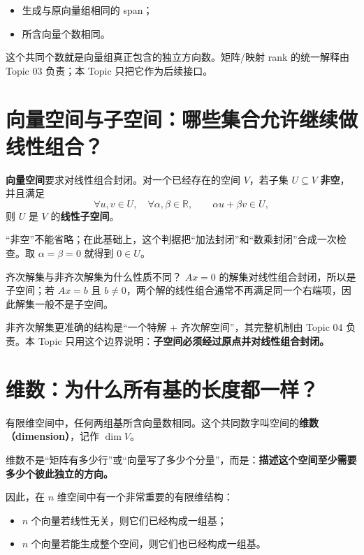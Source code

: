 \documentclass[11pt,a4paper]{ctexart}
\newcommand{\kw}[1]{\textbf{\color{deep}#1}}
\begin{document}
\begin{itemize}
  \item 生成与原向量组相同的 span；
  \item 所含向量个数相同。
\end{itemize}

这个共同个数就是向量组真正包含的独立方向数。矩阵/映射 rank 的统一解释由 Topic 03 负责；本 Topic 只把它作为后续接口。

\section{向量空间与子空间：哪些集合允许继续做线性组合？}

\kw{向量空间}要求对线性组合封闭。对一个已经存在的空间 $V$，若子集 $U\subseteq V$ \kw{非空}，并且满足
\[
\forall u,v\in U,\quad \forall\alpha,\beta\in\mathbb R,
\qquad \alpha u+\beta v\in U,
\]
则 $U$ 是 $V$ 的\kw{线性子空间}。

“非空”不能省略；在此基础上，这个判据把“加法封闭”和“数乘封闭”合成一次检查。取 $\alpha=\beta=0$ 就得到 $0\in U$。

\begin{warnbox}{齐次解集与非齐次解集为什么性质不同？}
$Ax=0$ 的解集对线性组合封闭，所以是子空间；若 $Ax=b$ 且 $b\neq0$，两个解的线性组合通常不再满足同一个右端项，因此解集一般不是子空间。

非齐次解集更准确的结构是“一个特解 + 齐次解空间”，其完整机制由 Topic 04 负责。本 Topic 只用这个边界说明：\kw{子空间必须经过原点并对线性组合封闭。}
\end{warnbox}

\section{维数：为什么所有基的长度都一样？}

有限维空间中，任何两组基所含向量数相同。这个共同数字叫空间的\kw{维数（dimension）}，记作 $\dim V$。

维数不是“矩阵有多少行”或“向量写了多少个分量”，而是：\kw{描述这个空间至少需要多少个彼此独立的方向。}

因此，在 $n$ 维空间中有一个非常重要的有限维结构：

\begin{itemize}
  \item $n$ 个向量若线性无关，则它们已经构成一组基；
  \item $n$ 个向量若能生成整个空间，则它们也已经构成一组基。
\end{itemize}
\end{document}
